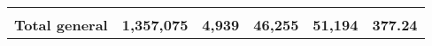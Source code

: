 \begin{tabular}{lrcclr}
	& \multicolumn{1}{l}{}                                           & \multicolumn{1}{l}{}                                       & \multicolumn{1}{l}{} &                                                                     & \multicolumn{1}{l}{}                                                         \\
	\rowcolor[HTML]{DDEBF7} 
	\textbf{Total   general}                                       & \textbf{1,357,075}                                             & \multicolumn{1}{r}{\cellcolor[HTML]{DDEBF7}\textbf{4,939}} & \textbf{46,255}      & \textbf{51,194}                                                     & \textbf{377.24}                                                             
\end{tabular}